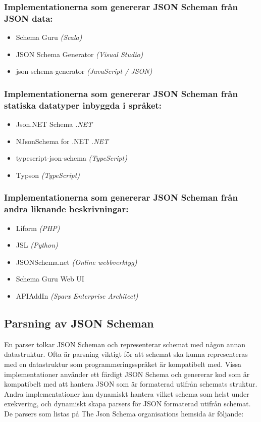 \subsubsection{Implementationerna som genererar JSON Scheman från JSON data:}
\begin{itemize}
	\item Schema Guru \textit{(Scala)} \cite{Snowplow}
	\item JSON Schema Generator \textit{(Visual Studio)} \cite{MadsKristensen}
	\item json-schema-generator \textit{(JavaScript / JSON)} \cite{Romanovich}
\end{itemize}

\subsubsection{Implementationerna som genererar JSON Scheman från statiska datatyper inbyggda i språket:}
\begin{itemize}
	\item Json.NET Schema \textit{.NET} \cite{Newtonsoft}
	\item NJsonSchema for .NET \textit{.NET} \cite{Suter}
	\item typescript-json-schema \textit{(TypeScript)} \cite{El-Dardiry}
	\item Typson \textit{(TypeScript)} \cite{Bovet}
\end{itemize}

\subsubsection{Implementationerna som genererar JSON Scheman från andra liknande beskrivningar:}
\begin{itemize}
	\item Liform \textit{(PHP)} \cite{Limenius}
	\item JSL \textit{(Python)} \cite{Romanovich}
	\item JSONSchema.net \textit{(Online webbverktyg)} \cite{Bovet}
	\item Schema Guru Web UI
	\item APIAddIn \textit{(Sparx Enterprise Architect)} \cite{Tomlinson}
\end{itemize}

\subsection{Parsning av JSON Scheman}
\label{sec:teori:schema-användningsområden:parsning}
En parser tolkar JSON Scheman och representerar schemat med någon annan datastruktur. Ofta är parsning viktigt för att schemat ska kunna representeras med en datastruktur som programmeringsspråket är kompatibelt med. Vissa implementationer använder ett färdigt JSON Schema och genererar kod som är kompatibelt med att hantera JSON som är formaterad utifrån schemats struktur. Andra implementationer kan dynamiskt hantera vilket schema som helst under exekvering, och dynamiskt skapa parsers för JSON formaterad utifrån schemat. De parsers som listas på The Json Schema organisations hemsida är följande:

